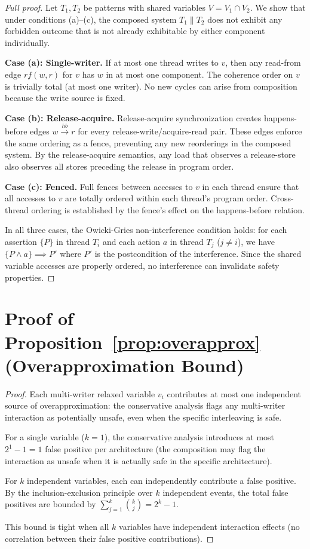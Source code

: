 \documentclass[11pt]{article}
\begin{document}
\begin{proof}[Full proof]
Let $T_1, T_2$ be patterns with shared variables $V = V_1 \cap V_2$.
We show that under conditions (a)--(c), the composed system
$T_1 \| T_2$ does not exhibit any forbidden outcome that is
not already exhibitable by either component individually.

\textbf{Case (a): Single-writer.}
If at most one thread writes to $v$, then any read-from edge
$\mathit{rf}(w, r)$ for $v$ has $w$ in at most one component.
The coherence order on $v$ is trivially total (at most one writer).
No new cycles can arise from composition because the write source
is fixed.

\textbf{Case (b): Release-acquire.}
Release-acquire synchronization creates happens-before edges
$w \xrightarrow{\mathit{hb}} r$ for every release-write/acquire-read
pair. These edges enforce the same ordering as a fence,
preventing any new reorderings in the composed system.
By the release-acquire semantics, any load that observes a
release-store also observes all stores preceding the release
in program order.

\textbf{Case (c): Fenced.}
Full fences between accesses to $v$ in each thread ensure that
all accesses to $v$ are totally ordered within each thread's
program order. Cross-thread ordering is established by the
fence's effect on the happens-before relation.

In all three cases, the Owicki-Gries non-interference condition
holds: for each assertion $\{P\}$ in thread $T_i$ and each
action $a$ in thread $T_j$ ($j \neq i$), we have
$\{P \wedge a\} \implies P'$ where $P'$ is the postcondition
of the interference. Since the shared variable accesses are
properly ordered, no interference can invalidate safety properties.
\end{proof}

\section{Proof of Proposition~\ref{prop:overapprox} (Overapproximation Bound)}
\label{app:overapprox-proof}

\begin{proof}
Each multi-writer relaxed variable $v_i$ contributes at most one
independent source of overapproximation: the conservative analysis
flags any multi-writer interaction as potentially unsafe, even when
the specific interleaving is safe.

For a single variable ($k=1$), the conservative analysis introduces
at most $2^1 - 1 = 1$ false positive per architecture (the
composition may flag the interaction as unsafe when it is actually
safe in the specific architecture).

For $k$ independent variables, each can independently contribute
a false positive. By the inclusion-exclusion principle over
$k$ independent events, the total false positives are bounded by
$\sum_{j=1}^{k} \binom{k}{j} = 2^k - 1$.

This bound is tight when all $k$ variables have independent
interaction effects (no correlation between their false positive
contributions).
\end{proof}
\end{document}
